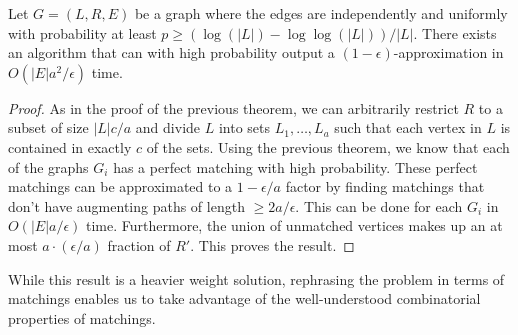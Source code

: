 \begin{thm}
Let $G=(L,R,E)$ be a graph where the edges are independently and uniformly with probability at least $p \geq (\log(|L|)-\log\log(|L|))/|L|$.   There exists an algorithm that can with high probability output a $(1-\epsilon)$-approximation in $O(|E|a^2/\epsilon)$ time.
\end{thm}
\begin{proof}
As in the proof of the previous theorem, we can arbitrarily restrict $R$ to a subset of size $|L|c/a$ and divide $L$ into sets $L_1,\ldots,L_a$ such that each vertex in $L$ is contained in exactly $c$ of the sets. Using the previous theorem, we know that each of the graphs $G_i$ has a perfect matching with high probability. These perfect matchings can be approximated to a $1-\epsilon/a$ factor by finding matchings that don't have augmenting paths of length $\geq 2a/\epsilon$. This can be done for each $G_i$ in $O(|E|a/\epsilon)$ time. Furthermore, the union of unmatched vertices makes up an at most $a\cdot(\epsilon/a)$ fraction of $R'$. This proves the result. 
\end{proof}

While this result is a heavier weight solution, rephrasing the problem in terms of matchings enables us to take advantage of the well-understood combinatorial properties of matchings.